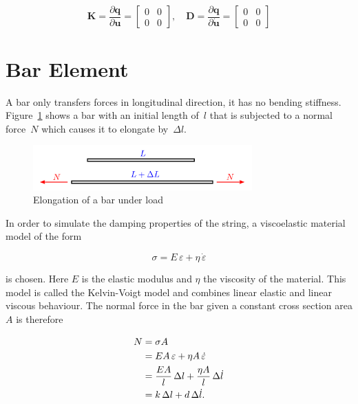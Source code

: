 \begin{equation}
\boldsymbol{K} = \frac{\partial \boldsymbol{q}}{\partial \boldsymbol{u}} =
\begin{bmatrix}
0 & 0\\
0 & 0
\end{bmatrix},
\quad
\boldsymbol{D} = \frac{\partial \boldsymbol{q}}{\partial \dot{\boldsymbol{u}}} =
\begin{bmatrix}
0 & 0\\
0 & 0
\end{bmatrix}
\end{equation}

\newpage
\section{Bar Element}

A bar only transfers forces in longitudinal direction, it has no bending stiffness. Figure~\ref{fig:bar-element-1} shows a bar with an initial length of~$l$ that is subjected to a normal force~$N$ which causes it to elongate by~$\Delta l$.

\begin{figure}[h]
\centering
\includegraphics[width=0.75\textwidth]{figures/elements/bar-element-1}
\caption{Elongation of a bar under load}
\label{fig:bar-element-1}
\end{figure}

In order to simulate the damping properties of the string, a viscoelastic material model of the form

\begin{equation}
\sigma = E\,\varepsilon + \eta\,\dot{\varepsilon}
\end{equation}

is chosen. Here $E$ is the elastic modulus and $\eta$ the viscosity of the material. This model is called the Kelvin-Voigt model and combines linear elastic and linear viscous behaviour. The normal force in the bar given a constant cross section area $A$ is therefore

\begin{align}
N &= \sigma A \notag \\
&= EA\,\varepsilon + \eta A\,\dot{\varepsilon} \notag \\
&= \frac{EA}{l}\,\Delta l + \frac{\eta A}{l}\,\Delta \dot{l} \\
&= k\,\Delta l + d\,\Delta \dot{l}.\label{eq:bar-constitutive}
\end{align}

